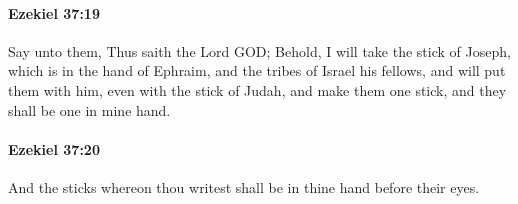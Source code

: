 		\paragraph{Ezekiel 37:19} %
			\label{EZEKIEL-37-19}

			Say unto them, Thus saith the Lord GOD; Behold, I will take the stick of Joseph, which is in the hand of Ephraim, and the tribes of Israel his fellows, and will put them with him, even with the stick of Judah, and make them one stick, and they shall be one in mine hand.


		\paragraph{Ezekiel 37:20} %
			\label{EZEKIEL-37-20}

			And the sticks whereon thou writest shall be in thine hand before their eyes.


